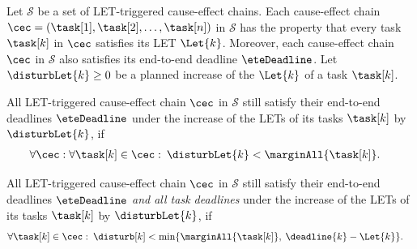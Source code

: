 \begin{tcolorbox}[colback=black!5!white,colframe=black!75!black, breakable, 
title= \textbf{Theorem} (Robustness test for LET-triggered cause-effect chains)]
Let $\mathcal{S}$ be a set of LET-triggered cause-effect chains. 
Each cause-effect chain $\cec = (\task[1], \task[2], \ldots, \task[n])$ in $\mathcal{S}$ has the property that every task $\task[k]$ in $\cec$ satisfies its LET $\Let{k}$. 
Moreover, each cause-effect chain $\cec$ in $\mathcal{S}$ also satisfies its end-to-end deadline $\eteDeadline$.
%
Let $\disturbLet{k} \geq 0$ be a planned increase of the $\Let{k}$ of a task $\task[k]$.
\smallskip

All LET-triggered cause-effect chain $\cec$ in $\mathcal{S}$ still satisfy their end-to-end deadlines $\eteDeadline$ under the increase of the LETs of its tasks $\task[k]$ by $\disturbLet{k}$, if  
\begin{align*}
	& \forall \cec: \forall \task[k] \in \cec: \:
	\disturbLet{k} < \marginAll{\task[k]}. 
\end{align*}	

All LET-triggered cause-effect chain $\cec$ in $\mathcal{S}$ still satisfy their end-to-end deadlines $\eteDeadline$ \emph{and all task deadlines} under the increase of the LETs of its tasks $\task[k]$ by $\disturbLet{k}$, if  
\begin{align*}
	& \forall \task[k] \in \cec: \:
	\disturb[k] < 
	\min \{\marginAll{\task[k]}, \: \deadline{k} - \Let{k}\}.
\end{align*}	

\end{tcolorbox}







